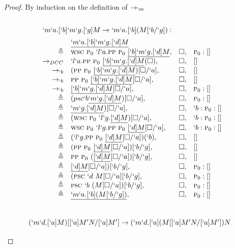 \begin{proof}{By induction on the definition of $\rightarrow_{`m}$}
\[\]
\\ 
\[
\begin{array}{rlrl}
  \prooflabel{`m`a.[`b]`m`g.[`g]M \to `m`a.[`b](M[`b/`g]):} \\
               & \tr{`m`a.[`b]`m`g.[`d]M} \\
    \triangleq & \wsc\ \gp\ `l`a.\pp\ \gp\ \tr{[`b]`m`g.[`d]M},    & \square, & \gp:[] \\
    \todcc\    & `l`a.\pp\ \gp\ \tr{[`b]`m`g.[`d]M}(\square),    & \square, & [] \\
    \tob\      & (\pp\ \gp\ \tr{[`b]`m`g.[`d]M})[\square/`a],    & \square, & [] \\
    \tob\      & \pp\ \gp\ \tr{[`b]`m`g.[`d]M}[\square/`a],      & \square, & [] \\
    \tob\      & \tr{[`b]`m`g.[`d]M}[\square/`a],              & \square, & \gp:[] \\
    \triangleq & (psc `b \tr{`m`g.[`d]M})[\square/`a],         & \square, & \gp:[] \\
    \triangleq & \tr{`m`g.[`d]M})[\square/`a],                 & \square, & `b:\gp:[] \\
    \triangleq & (\wsc\ \gp\ `l`g.\tr{[`d]M})[\square/`a],       & \square, & `b:\gp:[] \\
    \triangleq & \wsc\ \gp\ `l`g.\pp\ \gp\ \tr{[`d]M}[\square/`a], & \square, & `b:\gp:[] \\
    \triangleq & (`l`g.\pp\ \gp\ \tr{[`d]M}[\square/`a])(`b),    & \square, & [] \\
    \triangleq & (\pp\ \gp\ \tr{[`d]M}[\square/`a])[`b/`g],      & \square, & [] \\
    \triangleq & \pp\ \gp\ (\tr{[`d]M}[\square/`a])[`b/`g],      & \square, & [] \\
    \triangleq & \tr{[`d]M}[\square/`a])[`b/`g],               & \square, & \gp:[] \\
    \triangleq & (\psc\ `d\ M[\square/`a][`b/`g],              & \square, & \gp:[] \\
    \triangleq & \psc\ `b\ (M[\square/`a])[`b/`g],             & \square, & \gp:[] \\
    \triangleq & \tr{`m`a.[`b](M[`b/`g])},                     & \square, & \gp:[]
\end{array}
\]
\\ 
\[
\begin{array}{rlrl}
  \prooflabel{(`m`d.[`a]M)[[`a]M^\prime N/[`a]M^\prime]
    \to (`m`d.[`a](M[[`a]M^\prime N/[`a]M^\prime])N} \\

\end{array}\]
\end{proof}
